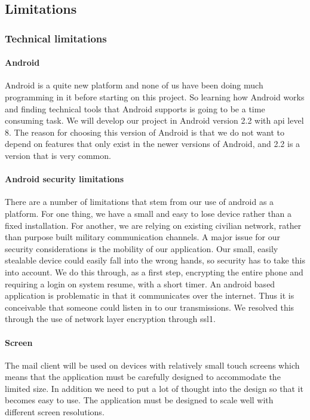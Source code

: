 \subsection{Limitations}

\subsubsection{Technical limitations}

\paragraph{Android}\hfill
\newline
Android is a quite new platform and none of us have been doing much programming in it before starting on this project. So learning how Android works and finding technical tools that Android supports is going to be a time consuming task. We will develop our project in Android version 2.2 with \gls{api} level 8. The reason for choosing this version of Android is that we do not want to depend on features that only exist in the newer versions of Android, and 2.2 is a version that is very common.

\paragraph{Android security limitations}\hfill
\newline
There are a number of limitations that stem from our use of android as a platform. For one thing, we have a small and easy to lose device rather than a fixed installation. For another, we are relying on existing civilian network, rather than purpose built military communication channels.
\newline
\newline
A major issue for our security considerations is the mobility of our application. Our small, easily stealable device could easily fall into the wrong hands, so security has to take this into account. We do this through, as a first step, encrypting the entire phone and requiring a login on system resume, with a short timer.
\newline
\newline
An android based application is problematic in that it communicates over the internet. Thus it is conceivable that someone could listen in to our transmissions. We resolved this through the use of network layer encryption through \gls{ssl1}. 

\paragraph{Screen}\hfill
\newline
The mail client will be used on devices with relatively small touch screens which means that the application must be carefully designed to accommodate the limited size. In addition we need to put a lot of thought into the design so that it becomes easy to use. The application must be designed to scale well with different screen resolutions.

